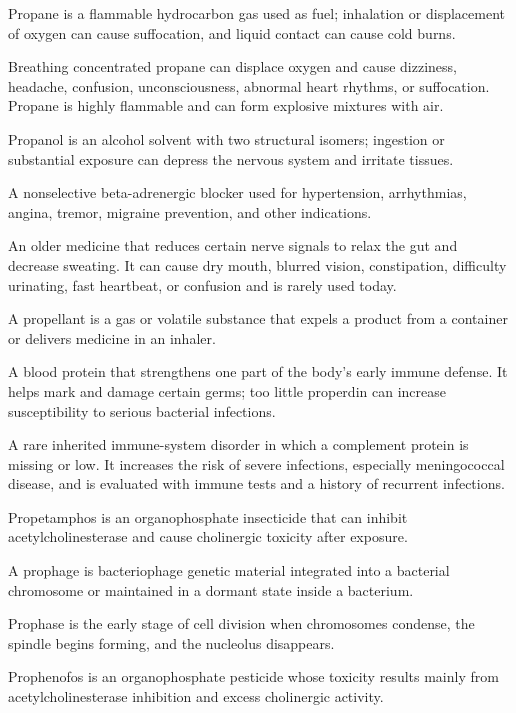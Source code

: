  Propane is a flammable hydrocarbon gas used as fuel; inhalation or displacement of oxygen can cause suffocation, and liquid contact can cause cold burns.

 Breathing concentrated propane can displace oxygen and cause dizziness, headache, confusion, unconsciousness, abnormal heart rhythms, or suffocation. Propane is highly flammable and can form explosive mixtures with air.

 Propanol is an alcohol solvent with two structural isomers; ingestion or substantial exposure can depress the nervous system and irritate tissues.

 A nonselective beta-adrenergic blocker used for hypertension, arrhythmias, angina, tremor, migraine prevention, and other indications.

 An older medicine that reduces certain nerve signals to relax the gut and decrease sweating. It can cause dry mouth, blurred vision, constipation, difficulty urinating, fast heartbeat, or confusion and is rarely used today.

 A propellant is a gas or volatile substance that expels a product from a container or delivers medicine in an inhaler.

 A blood protein that strengthens one part of the body’s early immune defense. It helps mark and damage certain germs; too little properdin can increase susceptibility to serious bacterial infections.

 A rare inherited immune-system disorder in which a complement protein is missing or low. It increases the risk of severe infections, especially meningococcal disease, and is evaluated with immune tests and a history of recurrent infections.

 Propetamphos is an organophosphate insecticide that can inhibit acetylcholinesterase and cause cholinergic toxicity after exposure.

 A prophage is bacteriophage genetic material integrated into a bacterial chromosome or maintained in a dormant state inside a bacterium.

 Prophase is the early stage of cell division when chromosomes condense, the spindle begins forming, and the nucleolus disappears.

 Prophenofos is an organophosphate pesticide whose toxicity results mainly from acetylcholinesterase inhibition and excess cholinergic activity.

